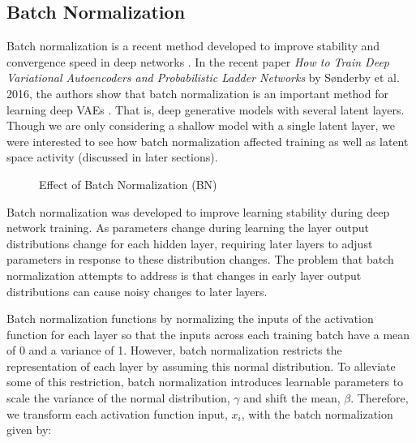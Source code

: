 \documentclass{article} %
\numberwithin{figure}{section}
\begin{document}
\subsection{Batch Normalization}
Batch normalization is a recent method developed to improve stability and convergence speed in deep networks \cite{Ioffe2015}. In the recent paper \textit{How to Train Deep Variational Autoencoders and Probabilistic Ladder Networks} by S\o nderby et al. 2016, the authors show that batch normalization is an important method for learning deep VAEs \cite{Sonderby2016}. That is, deep generative models with several latent layers. Though we are only considering a shallow model with a single latent layer, we were interested to see how batch normalization affected training as well as latent space activity (discussed in later sections).
\begin{wrapfigure}{l}{0.5\textwidth}
    \resizebox{\linewidth}{!}{}
    \caption{Effect of Batch Normalization (BN)}
    \label{fig:bncost}
\end{wrapfigure}
\par Batch normalization was developed to improve learning stability during deep network training. As parameters change during learning the layer output distributions change for each hidden layer, requiring later layers to adjust parameters in response to these distribution changes. The problem that batch normalization attempts to address is that changes in early layer output distributions can cause noisy changes to later layers. 
\par Batch normalization functions by normalizing the inputs of the activation function for each layer so that the inputs across each training batch have a mean of 0 and a variance of 1. However, batch normalization restricts the representation of each layer by assuming this normal distribution. To alleviate some of this restriction, batch normalization introduces learnable parameters to scale the variance of the normal distribution, $\gamma$ and shift the mean, $\beta$. Therefore, we transform each activation function input, $x_i$, with the batch normalization given by:
\end{document}
